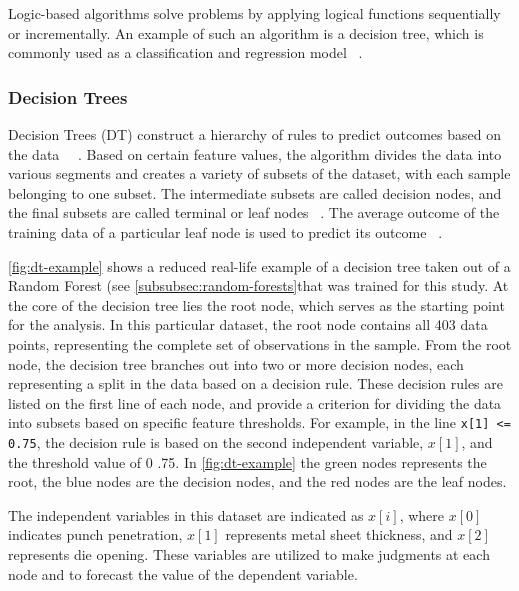 {Logic-based algorithms solve problems by applying logical functions sequentially or
incrementally.
An example of such an algorithm is a decision tree, which is commonly used as a classification
and regression model
~\cite[p. 10]{dridi2021supervised}.

\subsubsection{Decision Trees}
Decision Trees (DT) construct a hierarchy of rules to predict outcomes based on the
data
~\cite[p. 70]{muller_introductionmachinelearning_2016}~\cite[p. 253]{shaik_briefsurveyrandom_2019}.
Based on certain feature values, the algorithm divides the data into various segments and creates a variety of
subsets of the dataset, with each sample belonging to one subset.
The intermediate subsets are called decision nodes, and the final subsets are called terminal or leaf nodes
~\cite[p. 358]{geron2022hands}.
The average outcome of the training data of a particular leaf node is used to predict its
outcome
~\cite[p. 70--72]{muller_introductionmachinelearning_2016}.

\cref{fig:dt-example} shows a reduced real-life example of a decision tree taken out of a Random Forest
(see \cref{subsubsec:random-forests}that was trained for this study.
At the core of the decision tree lies the root node, which serves as the starting point for the analysis.
In this particular dataset, the root node contains all 403 data points, representing the complete set of observations
in the sample.
From the root node, the decision tree branches out into two or more decision nodes, each representing a split in the
data based on a decision rule.
These decision rules are listed on the first line of each node, and provide a criterion for dividing the data into
subsets based on specific feature thresholds.
For example, in the line \texttt{x[1] <= 0.75}, the decision rule is based on the second independent variable,
$x[1]$, and the threshold value of 0 .75.
In \cref{fig:dt-example} the green nodes represents the root, the blue nodes are the decision nodes, and the red
nodes are the leaf nodes.

The independent variables in this dataset are indicated as $x[i]$, where $x[0]$ indicates punch penetration, $x[1]$
represents metal sheet thickness, and $x[2]$ represents die opening.
These variables are utilized to make judgments at each node and to forecast the value of the dependent variable.

}
